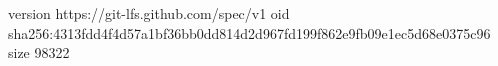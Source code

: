 version https://git-lfs.github.com/spec/v1
oid sha256:4313fdd4f4d57a1bf36bb0dd814d2d967fd199f862e9fb09e1ec5d68e0375c96
size 98322
